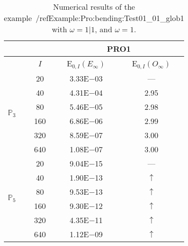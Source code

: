 \begin{table}[H]
\caption{Numerical results of the example~/ref{Example:Pro:bending:Test01_01_glob1} with $\omega=1|1$, and $\omega=1$.}
\setlength{\tabcolsep}{5pt}
\centering
\begin{tabular}{@{}l c c c@{}}
\toprule
 &  & \multicolumn{2}{c}{PRO1}\\
\midrule
 & $I$ & E$_{0,I}(E_{\infty})$ & E$_{0,I}(O_{\infty})$\\
\midrule
\multirow{6}{*}{$\mathbb{P}_{3}$}
 & 20 & 3.33E$-$03 & ---\\
 & 40 & 4.31E$-$04 & 2.95\\
 & 80 & 5.46E$-$05 & 2.98\\
 & 160 & 6.86E$-$06 & 2.99\\
 & 320 & 8.59E$-$07 & 3.00\\
 & 640 & 1.08E$-$07 & 3.00\\
\midrule
\multirow{6}{*}{$\mathbb{P}_{5}$}
 & 20 & 9.04E$-$15 & ---\\
 & 40 & 1.90E$-$13 & $\uparrow$\\
 & 80 & 9.53E$-$13 & $\uparrow$\\
 & 160 & 9.30E$-$12 & $\uparrow$\\
 & 320 & 4.35E$-$11 & $\uparrow$\\
 & 640 & 1.12E$-$09 & $\uparrow$\\
\bottomrule
\end{tabular}
\label{Table:PRO:test_01_01_test9_pro1}
\end{table}
